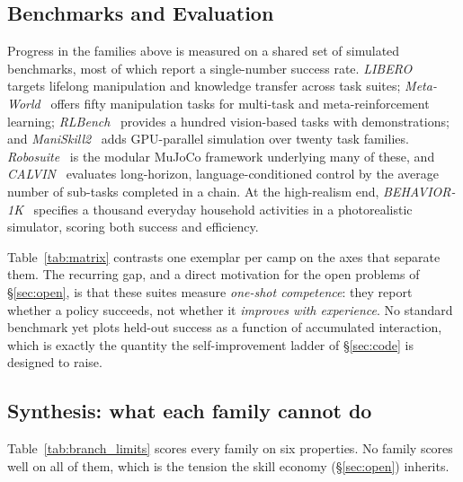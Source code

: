\subsection{Benchmarks and Evaluation}
\label{sec:bench}

Progress in the families above is measured on a shared set of simulated benchmarks, most of
which report a single-number success rate. \emph{LIBERO}~\citep{libero} targets lifelong
manipulation and knowledge transfer across task suites; \emph{Meta-World}~\citep{metaworld}
offers fifty manipulation tasks for multi-task and meta-reinforcement learning;
\emph{RLBench}~\citep{rlbench} provides a hundred vision-based tasks with demonstrations; and
\emph{ManiSkill2}~\citep{maniskill2} adds GPU-parallel simulation over twenty task families.
\emph{Robosuite}~\citep{robosuite} is the modular MuJoCo framework underlying many of these,
and \emph{CALVIN}~\citep{calvin} evaluates long-horizon, language-conditioned control by the
average number of sub-tasks completed in a chain. At the high-realism end,
\emph{BEHAVIOR-1K}~\citep{behavior1k} specifies a thousand everyday household activities in a
photorealistic simulator, scoring both success and efficiency.

Table~\ref{tab:matrix} contrasts one exemplar per camp on the axes that separate them. The
recurring gap, and a direct motivation for the open problems of \S\ref{sec:open}, is that
these suites measure \emph{one-shot competence}: they report whether a policy succeeds, not
whether it \emph{improves with experience}. No standard benchmark yet plots held-out success as
a function of accumulated interaction, which is exactly the quantity the self-improvement ladder
of \S\ref{sec:code} is designed to raise.



\subsection{Synthesis: what each family cannot do}
\label{sec:synthesis}
Table~\ref{tab:branch_limits} scores every family on six properties. No family scores well on
all of them, which is the tension the skill economy (\S\ref{sec:open}) inherits.


